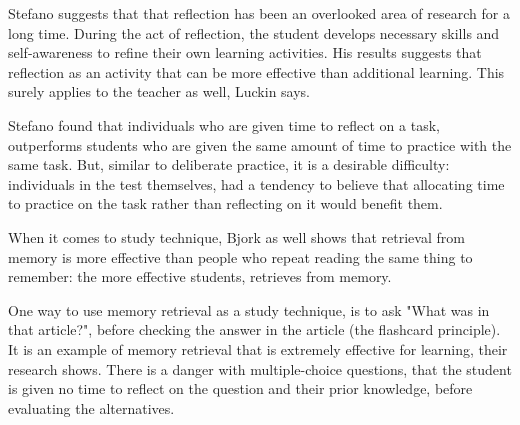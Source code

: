   Stefano \citep{stefano} suggests that that reflection has been an overlooked area of research for a long time. During the act of reflection, the student develops necessary skills and self-awareness to refine their own learning activities. His results suggests that reflection as an activity that can be more effective than additional learning. This surely applies to the teacher as well, Luckin says. \citep{luckin}

  Stefano found that individuals who are given time to reflect on a task, outperforms students who are given the same amount of time to practice with the same task. But, similar to deliberate practice, it is a desirable difficulty: individuals in the test themselves, had a tendency to believe that allocating time to practice on the task rather than reflecting on it would benefit them.


  When it comes to study technique, Bjork \citep{bjork} as well shows that retrieval from memory is more effective than people who repeat reading the same thing to remember: the more effective students, retrieves from memory.

  One way to use memory retrieval as a study technique, is to ask "What was in that article?", before checking the answer in the article (the flashcard principle). It is an example of memory retrieval that is extremely effective for learning, their research shows. There is a danger with multiple-choice questions, that the student is given no time to reflect on the question and their prior knowledge, before evaluating the alternatives.





%
